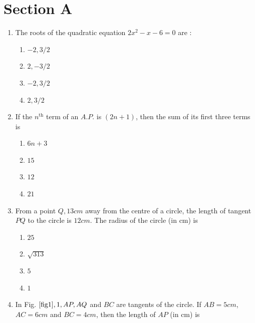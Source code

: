 \documentclass[journal,12pt,twocolumn]{IEEEtran}
\renewcommand\thesection{\arabic{section}}
\begin{document}
\section{Section A}
\renewcommand{\theequation}{\theenumi}
\begin{enumerate}[label=\thesection.\arabic*.,ref=\thesection.\theenumi]
\item The roots of the  quadratic equation $2x^2-x-6=0$ are :
 \begin{enumerate}
    \item $-2,3/2$\\
    \item $2, -3/2$\\
    \item $-2, 3/2$\\
    \item $2, 3/2$\\
 \end{enumerate} 
\item If the  $n^{\text{th}}$ term of an $A.P.$ is $(2n+ 1)$, then the sum of its first three terms is
 \begin{enumerate}
    \item $6n + 3$\\
    \item $15$ \\
    \item $12$\\
    \item $21$ \\
 \end{enumerate}
\item From a point $Q, 13 cm$ away from the centre of a circle, the length of tangent $PQ$ to the circle is $12 cm$. The radius of the circle (in cm)
is \\
 \begin{enumerate}
    \item $25$\\
    \item $\sqrt{313}$\\
    \item $5$\\
    \item $1$ \\
 \end{enumerate}
\item In Fig. $\ref{fig1}, 1, AP, AQ$ and $BC$ are tangents of the circle. If $AB=5cm$, $AC=6cm$ and $BC=4 cm$, then the length of $AP$ (in cm) is \\

\end{enumerate}
\end{document}
